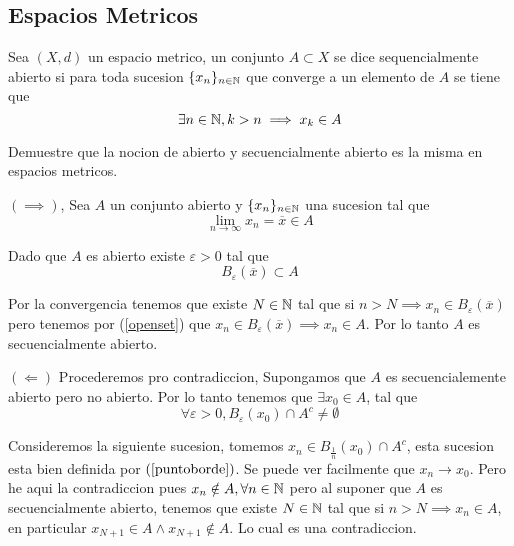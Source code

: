 \documentclass[../main.tex]{subfiles}
\begin{document}
\subsection{Espacios Metricos}
\begin{problem}
    Sea $(X, d)$ un espacio metrico, un conjunto $A \subset X$ se dice sequencialmente abierto si
    para toda sucesion $\{x_n\}_{n \in \mathbb{N}}$ que converge a un elemento de $A$ se tiene que
    \begin{equation*}
      \exists n \in \mathbb{N}, k > n \implies  x_{k} \in A
    \end{equation*}

    Demuestre que la nocion de abierto y secuencialmente abierto es la misma en espacios metricos.
  \end{problem}
\begin{solution}
    $(\implies)$, Sea $A$ un conjunto abierto y $\{x_n\}_{n \in \mathbb{N}}$ una sucesion tal que
    \begin{equation*}
      \lim_{n \to \infty} x_{n} = \overline{x} \in A
    \end{equation*}

    Dado que $A$ es abierto existe $\varepsilon > 0$ tal que
    \begin{equation}
      \label{openset}
      B_{\varepsilon}(\overline{x}) \subset A
    \end{equation}

    Por la convergencia tenemos que existe $N \in \mathbb{N}$ tal que si $n > N \implies x_{n} \in B_{\varepsilon}(\overline{x})$ pero tenemos por (\ref{openset}) que $x_{n} \in B_{\varepsilon}(\overline{x}) \implies x_{n} \in A$. Por lo tanto $A$ es secuencialmente abierto.

    $(\Longleftarrow)$ Procederemos pro contradiccion, Supongamos que $A$ es secuencialemente abierto pero no abierto. Por lo tanto tenemos que $\exists x_{0} \in A$, tal que
    \begin{equation}
      \label{puntoborde}
      \forall \varepsilon > 0, B_{\varepsilon}(x_{0}) \cap A^{c} \neq \emptyset
    \end{equation}

    Consideremos la siguiente sucesion, tomemos $x_{n} \in B_{\frac{1}{n}}(x_{0}) \cap A^{c}$, esta sucesion
    esta bien definida por $(\ref{puntoborde})$. Se puede ver facilmente que $x_{n} \to x_{0}$. Pero he aqui la contradiccion pues $x_{n} \notin A, \forall n \in \mathbb{N}$ pero al suponer que $A$ es secuencialmente abierto, tenemos que existe $N \in \mathbb{N}$ tal que si $n > N \implies x_{n} \in A$, en particular $x_{N + 1} \in A \land x_{N + 1} \notin A$. Lo cual es una contradiccion.
  \end{solution}
\end{document}
